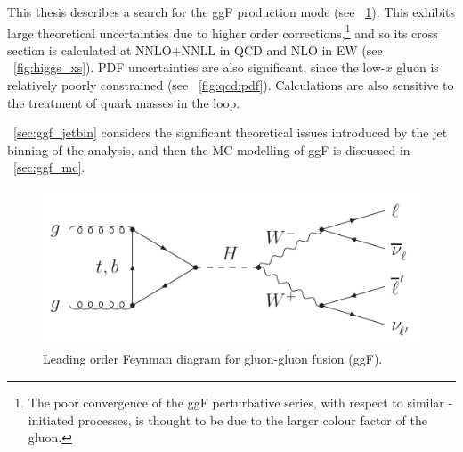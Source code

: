 
This thesis describes a search for the ggF production mode (see \Figure~\ref{fig:sig:ggF}). 
This exhibits large theoretical uncertainties due to higher order corrections,\footnote{
	The poor convergence of the ggF perturbative series, with respect to similar 
	\HepProcess{\Pquark\APquark}-initiated processes, is thought to be due to the larger 
	colour factor of the gluon.
}
and so its cross section is calculated at NNLO+NNLL in QCD and NLO in EW (see 
\Figure~\ref{fig:higgs_xs}). PDF uncertainties are also significant, since the low-$x$ gluon 
is relatively poorly constrained (see \Figure~\ref{fig:qcd:pdf}). Calculations are also 
sensitive to the treatment of quark masses in the loop.

\Section~\ref{sec:ggf_jetbin} considers the significant theoretical issues introduced by the 
jet binning of the analysis, and then the MC modelling of ggF is discussed in 
\Section~\ref{sec:ggf_mc}.

\begin{figure}[h]
	\includegraphics[width=\mediumfigwidth]{axodraw/ggf_WWlvlv.pdf}
	\caption{Leading order Feynman diagram for gluon-gluon fusion (ggF).}
	\label{fig:sig:ggF}
\end{figure}
